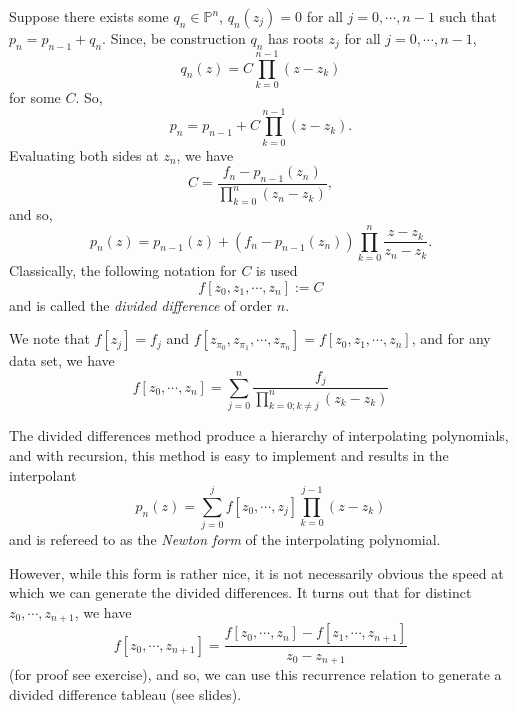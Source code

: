 \documentclass[
]{article}
\theoremstyle{definition}
\theoremstyle{definition}
\begin{document}
Suppose there exists some \(q_n \in \mathbb{P}^n\), \(q_n(z_j) = 0\) for
all \(j = 0, \cdots, n - 1\) such that \(p_n = p_{n - 1} + q_n\). Since,
be construction \(q_n\) has roots \(z_j\) for all
\(j = 0, \cdots, n - 1\), \[q_n(z) = C\prod_{k = 0}^{n - 1}(z - z_k)\]
for some \(C\). So,
\[p_n = p_{n - 1} + C\prod_{k = 0}^{n - 1}(z - z_k).\] Evaluating both
sides at \(z_n\), we have
\[C = \frac{f_n - p_{n - 1}(z_n)}{\prod_{k = 0}^n(z_n - z_k)},\] and so,
\[p_n(z) = p_{n - 1}(z) + (f_n - p_{n - 1}(z_n))\prod_{k = 0}^n\frac{z - z_k}{z_n - z_k}.\]
Classically, the following notation for \(C\) is used
\[f[z_0, z_1, \cdots, z_n] := C\] and is called the \emph{divided
difference} of order \(n\).

We note that \(f[z_j] = f_j\) and
\(f[z_{\pi_0}, z_{\pi_1}, \cdots, z_{\pi_n}] = f[z_0, z_1, \cdots, z_n]\),
and for any data set, we have
\[f[z_0, \cdots, z_n] = \sum_{j = 0}^n\frac{f_j}{\prod_{k = 0; k \neq j}^n(z_k - z_k)}\]

The divided differences method produce a hierarchy of interpolating
polynomials, and with recursion, this method is easy to implement and
results in the interpolant
\[p_n(z) = \sum_{j = 0}^j f[z_0, \cdots, z_j] \prod_{k = 0}^{j - 1}(z - z_k)\]
and is refereed to as the \emph{Newton form} of the interpolating
polynomial.

However, while this form is rather nice, it is not necessarily obvious
the speed at which we can generate the divided differences. It turns out
that for distinct \(z_0, \cdots, z_{n + 1}\), we have
\[f[z_0, \cdots, z_{n + 1}] = \frac{f[z_0, \cdots, z_n] - f[z_1, \cdots, z_{n + 1}]}
  {z_0 - z_{n + 1}}\] (for proof see exercise), and so, we can use this
recurrence relation to generate a divided difference tableau (see
slides).
\end{document}
